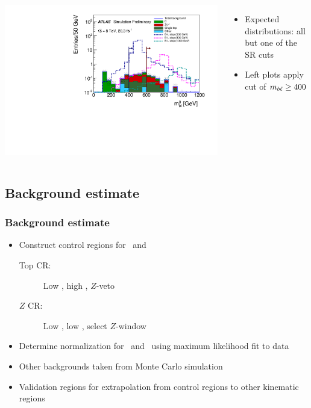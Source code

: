 \documentclass[10pt, svgnames]{beamer}
\begin{document}
\begin{frame}[t]
\begin{columns}
      \includegraphics[width=\textwidth]{figures/blstop/mbl_0_sr_minus_mbl.pdf}
    \begin{itemize}
      \item Expected distributions: all but one of the SR cuts
      \item Left plots apply cut of $m_{b\ell} \ge 400$
    \end{itemize}
  \end{columns}
\end{frame}



\subsection{Background estimate}

\begin{frame}
  \frametitle{Background estimate}
  \begin{itemize}
    \item Construct control regions for \TTBAR\ and \ZGAMMAJETS
      \begin{description}
        \item[Top CR:] Low \HT, high \MET, $Z$-veto
        \item[$Z$ CR:] Low \HT, low \MET, select $Z$-window
      \end{description}
    \item Determine normalization for \TTBAR\ and \ZGAMMAJETS\ using maximum
      likelihood fit to data
    \item Other backgrounds taken from Monte Carlo simulation
    \item Validation regions for extrapolation from control regions to other
      kinematic regions
  \end{itemize}
\end{frame}
\end{document}
